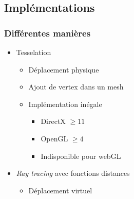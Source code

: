 \documentclass{beamer}
\begin{document}
\subsection{Implémentations}
\begin{frame}
    \frametitle{Différentes manières}
    \begin{itemize}
        \item Tesselation
            \begin{itemize}
                \item Déplacement \og{}physique \fg{}
                \item Ajout de vertex dans un mesh
                \item Implémentation inégale
                    \begin{itemize}
                        \item DirectX $\geq 11$
                        \item OpenGL $\geq 4$
                        \item Indisponible pour webGL
                    \end{itemize}
            \end{itemize}
        \item \emph{Ray tracing} avec fonctions distances
            \begin{itemize}
                \item Déplacement \og{}virtuel \fg{}
            \end{itemize}
    \end{itemize}
\end{frame}
\end{document}
